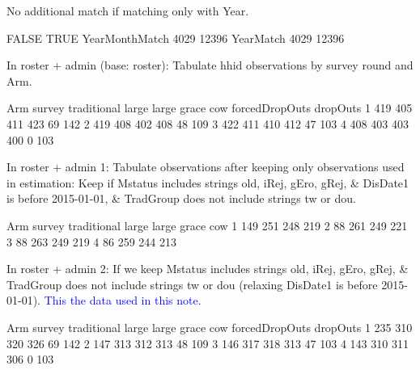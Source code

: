 No additional match if matching only with \textsf{Year}. 
\begin{Schunk}
\begin{Soutput}
               FALSE  TRUE
YearMonthMatch  4029 12396
YearMatch       4029 12396
\end{Soutput}
\end{Schunk}




In \textsf{roster + admin} (base: roster): Tabulate \textsf{hhid} observations by \textsf{survey} round and \textsf{Arm}.
\begin{Schunk}
\begin{Soutput}
      Arm
survey traditional large large grace cow forcedDropOuts dropOuts
     1         419   405         411 423             69      142
     2         419   408         402 408             48      109
     3         422   411         410 412             47      103
     4         408   403         403 400              0      103
\end{Soutput}
\end{Schunk}
In \textsf{roster + admin} 1: Tabulate observations after keeping only observations used in estimation: Keep if \textsf{Mstatus} includes strings old, iRej, gEro, gRej, \& \textsf{DisDate1} is before 2015-01-01, \& \textsf{TradGroup} does not include strings tw or dou.
\begin{Schunk}
\begin{Soutput}
      Arm
survey traditional large large grace cow
     1         149   251         248 219
     2          88   261         249 221
     3          88   263         249 219
     4          86   259         244 213
\end{Soutput}
\end{Schunk}
In \textsf{roster + admin} 2: If we keep \textsf{Mstatus} includes strings old, iRej, gEro, gRej, \& \textsf{TradGroup} does not include strings tw or dou (relaxing  \textsf{DisDate1} is before 2015-01-01). \textcolor{blue}{This the data used in this note.} \gobblepars
\begin{Schunk}
\begin{Soutput}
      Arm
survey traditional large large grace cow forcedDropOuts dropOuts
     1         235   310         320 326             69      142
     2         147   313         312 313             48      109
     3         146   317         318 313             47      103
     4         143   310         311 306              0      103
\end{Soutput}
\end{Schunk}
